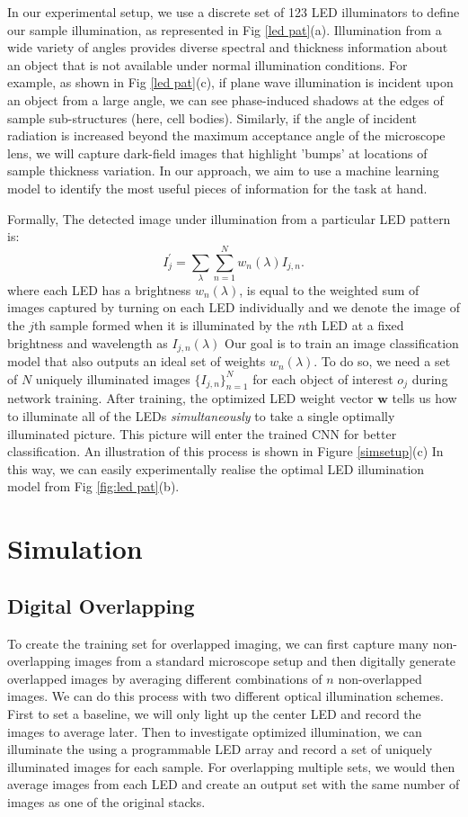 \documentclass{article}
\begin{document}
In our experimental setup, we use a discrete set of 123 LED illuminators to define our sample illumination, as represented in Fig \ref{led pat}(a). Illumination from a wide variety of angles provides diverse spectral and thickness information about an object that is not available under normal illumination conditions. For example, as shown in Fig \ref{led pat}(c), if plane wave illumination is incident upon an object from a large angle, we can see phase-induced shadows at the edges of sample sub-structures (here, cell bodies). Similarly, if the angle of incident radiation is increased beyond the maximum acceptance angle of the microscope lens, we will capture dark-field images that highlight 'bumps' at locations of sample thickness variation. In our approach, we aim to use a machine learning model to identify the most useful pieces of information for the task at hand.

Formally, The detected image under illumination from a particular LED pattern is:
\begin{equation}
I_j^\prime = \sum_{\lambda} \sum_{n=1}^N w_n(\lambda)I_{j,n}.
\label{eq:phys_layer}
\end{equation}
where each LED has a brightness $w_n(\lambda)$, is equal to the weighted sum of images captured by turning on each LED individually and we denote the image of the $j$th sample formed when it is illuminated by the $n$th LED at a fixed brightness and wavelength as $I_{j,n}(\lambda)$ Our goal is to train an image classification model that also outputs an ideal set of weights $w_n(\lambda)$. To do so, we need a set of $N$ uniquely illuminated images $\{I_{j,n}\}_{n=1}^N$ for each object of interest $o_j$ during network training. After training, the optimized LED weight vector $\mathbf{w}$ tells us how to illuminate all of the LEDs \emph{simultaneously} to take a single optimally illuminated picture. This picture will enter the trained CNN for better classification. An illustration of this process is shown in Figure \ref{simsetup}(c) In this way, we can easily experimentally realise the optimal LED illumination model from Fig \ref{fig:led pat}(b).

\section{Simulation}

\subsection{Digital Overlapping}
To create the training set for overlapped imaging, we can first capture many non-overlapping images from a standard microscope setup and then digitally generate overlapped images by averaging different combinations of $n$ non-overlapped images. We can do this process with two different optical illumination schemes. First to set a baseline, we will only light up the center LED and record the images to average later. Then to investigate optimized illumination, we can illuminate the using a programmable LED array and record a set of uniquely illuminated images for each sample. For overlapping multiple sets, we would then average images from each LED and create an output set with the same number of images as one of the original stacks.
\end{document}
